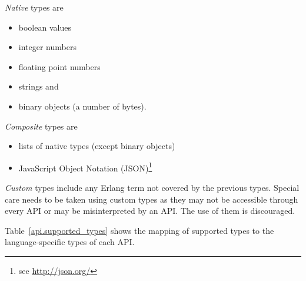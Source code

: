 \documentclass[a4paper]{scrreprt}
\begin{document}
\emph{Native} types are
\begin{itemize}
  \item boolean values
  \item integer numbers
  \item floating point numbers
  \item strings and
  \item binary objects (a number of bytes).
\end{itemize}

\emph{Composite} types are
\begin{itemize}
  \item lists of native types (except binary objects)
  \item JavaScript Object Notation (JSON)\footnote{see \url{http://json.org/}}
\end{itemize}

\emph{Custom} types include any Erlang term not covered by the previous types.
Special care needs to be taken using custom types as they may not be accessible
through every API or may be misinterpreted by an API. The use of them is
discouraged.

Table~\ref{api.supported_types} shows the mapping of supported types to the
language-specific types of each API.
\end{document}
